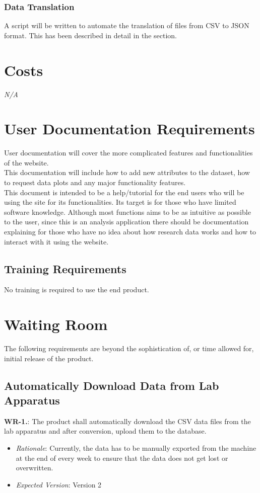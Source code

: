 \documentclass[12pt]{article}
\begin{document}
\subsubsection{Data Translation}
A script will be written to automate the translation of files from CSV to JSON format. This has been described in detail in the  section.

\section{Costs}
\emph{N/A}
\section{User Documentation Requirements}
User documentation will cover the more complicated features and functionalities of the website.\\

\noindent This documentation will include how to add new attributes to the dataset, how
to request data plots and any major functionality features.\\ \newline
This document is intended to be a help/tutorial for the end users who will be
using the site for its functionalities. Its target is for those who have limited
software knowledge. Although most functions aims to be as intuitive as possible
to the user, since this is an analysis application there should be documentation
explaining for those who have no idea about how research data works and how to
interact with it using the website.

\subsection{Training Requirements}
No training is required to use the end product.
\section{Waiting Room}
The following requirements are beyond the sophistication of, or time allowed for, initial release of the product.
\subsection{Automatically Download Data from Lab Apparatus}
\textbf{WR-1.}: The product shall automatically download the CSV data files from the lab apparatus and after conversion, upload them to the database.
\begin{itemize}
  \item \emph{Rationale}: Currently, the data has to be manually exported from the machine at the end of every week to ensure that the data does not get lost or overwritten.
  \item \emph{Expected Version}: Version 2
\end{itemize}
\end{document}
